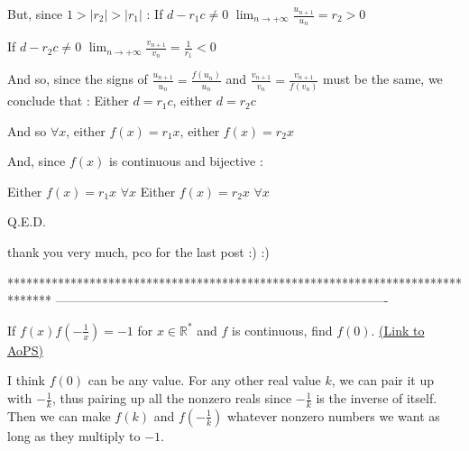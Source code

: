 \begin{solution}
But, since $ 1 > |r_2| > |r_1|$ :
If $ d - r_1c\neq 0$ $ \lim_{n\to + \infty}\frac {u_{n + 1}}{u_n} = r_2 > 0$ 

If $ d - r_2c\neq 0$ $ \lim_{n\to + \infty}\frac {v_{n + 1}}{v_n} = \frac 1{r_1} < 0$

And so, since the signs of ${ \frac {u_{n + 1}}{u_n} = \frac {f(u_n)}{u_n}}$ and $ \frac {v_{n + 1}}{v_n} = \frac {v_{n + 1}}{f(v_n)}$ must be the same, we conclude that :
Either $ d = r_1c$, either $ d = r_2c$

And so $ \forall x$, either $ f(x) = r_1x$, either $ f(x) = r_2x$

And, since $ f(x)$ is continuous and bijective :

Either $ f(x) = r_1x$ $ \forall x$
Either $ f(x) = r_2x$ $ \forall x$

Q.E.D.
\end{solution}



\begin{solution}
	thank you very much, pco for the last post   :)  :)
\end{solution}
*******************************************************************************
-------------------------------------------------------------------------------

\begin{problem}
	If $ f(x)f\left( - \frac {1}{x}\right) = - 1$ for $ x\in \mathbb{R^*}$ and $ f$ is continuous, find $ f(0)$.
	\flushright \href{https://artofproblemsolving.com/community/c6h300187}{(Link to AoPS)}
\end{problem}



\begin{solution}
	I think $ f(0)$ can be any value. For any other real value $ k$, we can pair it up with $ - \frac {1}{k}$, thus pairing up all the nonzero reals since $ - \frac {1}{k}$ is the inverse of itself. Then we can make $ f(k)$ and $ f( - \frac {1}{k})$ whatever nonzero numbers we want as long as they multiply to $ - 1$.
\end{solution}



